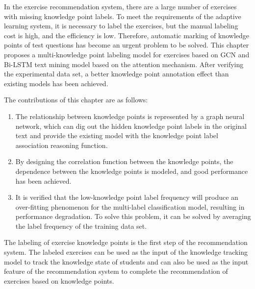 
In the exercise recommendation system, there are a large number of exercises with missing knowledge point labels. To meet the requirements of the adaptive learning system, it is necessary to label the exercises, but the manual labeling cost is high, and the efficiency is low. Therefore, automatic marking of knowledge points of test questions has become an urgent problem to be solved. This chapter proposes a multi-knowledge point labeling model for exercises based on GCN and Bi-LSTM text mining model based on the attention mechanism. After verifying the experimental data set, a better knowledge point annotation effect than existing models has been achieved.

The contributions of this chapter are as follows:
\begin{enumerate}
	\item The relationship between knowledge points is represented by a graph neural network, which can dig out the hidden knowledge point labels in the original text and provide the existing model with the knowledge point label association reasoning function.
	\item By designing the correlation function between the knowledge points, the dependence between the knowledge points is modeled, and good performance has been achieved.
	\item It is verified that the low-knowledge point label frequency will produce an over-fitting phenomenon for the multi-label classification model, resulting in performance degradation. To solve this problem, it can be solved by averaging the label frequency of the training data set.
\end{enumerate}

The labeling of exercise knowledge points is the first step of the recommendation system. The labeled exercises can be used as the input of the knowledge tracking model to track the knowledge state of students and can also be used as the input feature of the recommendation system to complete the recommendation of exercises based on knowledge points.

